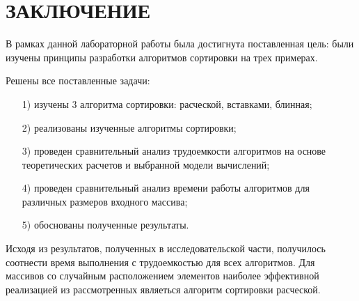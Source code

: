 {\centering \chapter*{ЗАКЛЮЧЕНИЕ}}

В рамках данной лабораторной работы была достигнута поставленная цель: были изучены принципы разработки алгоритмов сортировки на трех примерах.

Решены все поставленные задачи:
\begin{enumerate}
	\item[1)] изучены 3 алгоритма сортировки: расческой, вставками, блинная;
	\item[2)] реализованы изученные алгоритмы сортировки;
	\item[3)] проведен сравнительный анализ трудоемкости алгоритмов на основе теоретических расчетов и выбранной модели вычислений;
	\item[4)] проведен сравнительный анализ времени работы алгоритмов для различных размеров входного массива;
	\item[5)] обоснованы полученные результаты.
\end{enumerate}

Исходя из результатов, полученных в исследовательской части, получилось соотнести время выполнения с трудоемкостью для всех алгоритмов.
Для массивов со случайным расположением элементов наиболее эффективной реализацией из рассмотренных являеться алгоритм сортировки расческой.
